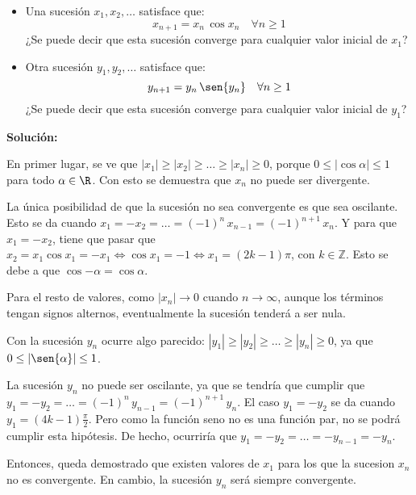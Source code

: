 \documentclass[../../main.tex]{subfiles}
\begin{document}
  \begin{shaded}
    \begin{itemize}
      \item Una sucesión $x_1, x_2, \dots$ satisface que:
      $$
      x_{n + 1} = x_n \, \cos{x_n} \quad \forall n \geq 1
      $$
      ¿Se puede decir que esta sucesión converge para cualquier valor inicial de $x_1$?

      \item Otra sucesión $y_1, y_2, \dots$ satisface que:
      $$
      y_{n + 1} = y_n \, \sen{y_n} \quad \forall n \geq 1
      $$
      ¿Se puede decir que esta sucesión converge para cualquier valor inicial de $y_1$?
    \end{itemize}
  \end{shaded}

  \textbf{Solución:}

  En primer lugar, se ve que $|x_1| \geq |x_2| \geq \dots \geq |x_n| \geq 0$, porque $0 \leq |\cos{\alpha}| \leq 1$ para todo $\alpha \in \R$. Con esto se demuestra que $x_n$ no puede ser divergente.

  La única posibilidad de que la sucesión no sea convergente es que sea oscilante. Esto se da cuando $x_1 = -x_2 = \dots = (-1)^n \, x_{n - 1} = (-1)^{n + 1} \, x_n$. Y para que $x_1 = -x_2$, tiene que pasar que $x_2 = x_1 \cos{x_1} = -x_1 \iff \cos{x_1} = -1 \iff x_1 = (2k - 1) \pi$, con $k \in \mathbb{Z}$. Esto se debe a que $\cos{-\alpha} = \cos{\alpha}$.

  Para el resto de valores, como $|x_n| \to 0$ cuando $n \to \infty$, aunque los términos tengan signos alternos, eventualmente la sucesión tenderá a ser nula.

  Con la sucesión $y_n$ ocurre algo parecido: $|y_1| \geq |y_2| \geq \dots \geq |y_n| \geq 0$, ya que $0 \leq |\sen{\alpha}| \leq 1$.

  La sucesión $y_n$ no puede ser oscilante, ya que se tendría que cumplir que $y_1 = -y_2 = \dots = (-1)^n \, y_{n - 1} = (-1)^{n + 1} \, y_n$. El caso $y_1 = -y_2$ se da cuando $y_1 = (4k - 1) \displaystyle\frac{\pi}{2}$. Pero como la función seno no es una función par, no se podrá cumplir esta hipótesis. De hecho, ocurriría que $y_1 = -y_2 = \dots = -y_{n - 1} = -y_n$.

  Entonces, queda demostrado que existen valores de $x_1$ para los que la sucesion $x_n$ no es convergente. En cambio, la sucesión $y_n$ será siempre convergente.
\end{document}
